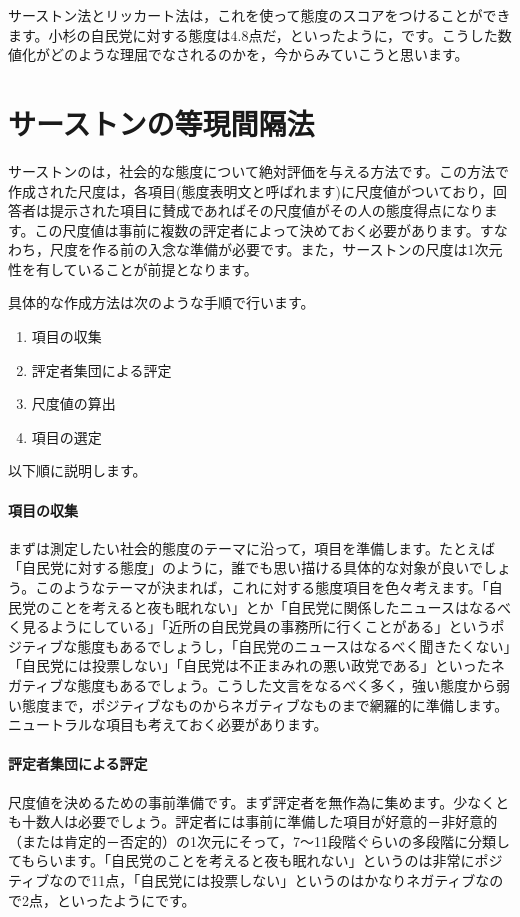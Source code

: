 \documentclass{ltjsbook}
\begin{document}
サーストン法とリッカート法は，これを使って態度のスコアをつけることができます。小杉の自民党に対する態度は4.8点だ，といったように，です。こうした数値化がどのような理屈でなされるのかを，今からみていこうと思います。

\section{サーストンの等現間隔法}
\label{ThurstoneScale}
サーストンのは，社会的な態度について絶対評価を与える方法です。この方法で作成された尺度は，各項目(態度表明文と呼ばれます)に尺度値がついており，回答者は提示された項目に賛成であればその尺度値がその人の態度得点になります。この尺度値は事前に複数の評定者によって決めておく必要があります。すなわち，尺度を作る前の入念な準備が必要です。また，サーストンの尺度は1次元性を有していることが前提となります。

具体的な作成方法は次のような手順で行います。
\begin{enumerate}
   \item 項目の収集
   \item 評定者集団による評定
   \item 尺度値の算出
   \item 項目の選定
\end{enumerate}

以下順に説明します。
\paragraph{項目の収集}まずは測定したい社会的態度のテーマに沿って，項目を準備します。たとえば「自民党に対する態度」のように，誰でも思い描ける具体的な対象が良いでしょう。このようなテーマが決まれば，これに対する態度項目を色々考えます。「自民党のことを考えると夜も眠れない」とか「自民党に関係したニュースはなるべく見るようにしている」「近所の自民党員の事務所に行くことがある」というポジティブな態度もあるでしょうし，「自民党のニュースはなるべく聞きたくない」「自民党には投票しない」「自民党は不正まみれの悪い政党である」といったネガティブな態度もあるでしょう。こうした文言をなるべく多く，強い態度から弱い態度まで，ポジティブなものからネガティブなものまで網羅的に準備します。ニュートラルな項目も考えておく必要があります。

\paragraph{評定者集団による評定}尺度値を決めるための事前準備です。まず評定者を無作為に集めます。少なくとも十数人は必要でしょう。評定者には事前に準備した項目が好意的－非好意的（または肯定的－否定的）の1次元にそって，7〜11段階ぐらいの多段階に分類してもらいます。「自民党のことを考えると夜も眠れない」というのは非常にポジティブなので11点，「自民党には投票しない」というのはかなりネガティブなので2点，といったようにです。
\end{document}
